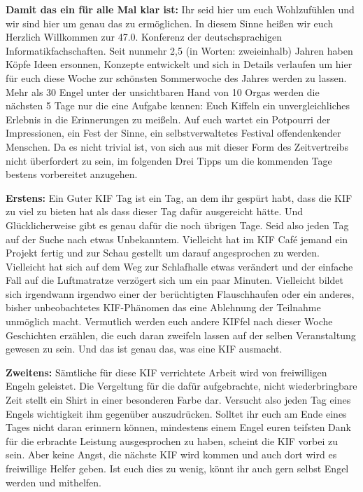
\textbf{Damit das ein für alle Mal klar ist:} Ihr seid hier um euch Wohlzufühlen und wir sind hier um genau das zu ermöglichen.
In diesem Sinne heißen wir euch Herzlich Willkommen zur 47.0. Konferenz der deutschsprachigen Informatikfachschaften.
Seit nunmehr 2,5 (in Worten: zweieinhalb) Jahren haben Köpfe Ideen ersonnen, Konzepte entwickelt und sich in Details verlaufen um hier für euch diese Woche zur schönsten Sommerwoche des Jahres werden zu lassen.
Mehr als 30 Engel unter der unsichtbaren Hand von 10 Orgas werden die nächsten 5 Tage nur die eine Aufgabe kennen: Euch Kiffeln ein unvergleichliches Erlebnis in die Erinnerungen zu meißeln.
Auf euch wartet ein Potpourri der Impressionen, ein Fest der Sinne, ein selbstverwaltetes Festival offendenkender Menschen.
Da es nicht trivial ist, von sich aus mit dieser Form des Zeitvertreibs nicht überfordert zu sein, im folgenden Drei Tipps um die kommenden Tage bestens vorbereitet anzugehen.

\textbf{Erstens:}
Ein Guter KIF Tag ist ein Tag, an dem ihr gespürt habt, dass die KIF zu viel zu bieten hat als dass dieser Tag dafür ausgereicht hätte.
Und Glücklicherweise gibt es genau dafür die noch übrigen Tage.
Seid also jeden Tag auf der Suche nach etwas Unbekanntem.
Vielleicht hat im KIF Café jemand ein Projekt fertig und zur Schau gestellt um darauf angesprochen zu werden.
Vielleicht hat sich auf dem Weg zur Schlafhalle etwas verändert und der einfache Fall auf die Luftmatratze verzögert sich um ein paar Minuten.
Vielleicht bildet sich irgendwann irgendwo einer der berüchtigten Flauschhaufen oder ein anderes, bisher unbeobachtetes KIF-Phänomen das eine Ablehnung der Teilnahme unmöglich macht.
Vermutlich werden euch andere KIFfel nach dieser Woche Geschichten erzählen, die euch daran zweifeln lassen auf der selben Veranstaltung gewesen zu sein.
Und das ist genau das, was eine KIF ausmacht.

\textbf{Zweitens:}
Sämtliche für diese KIF verrichtete Arbeit wird von freiwilligen Engeln geleistet.
Die Vergeltung für die dafür aufgebrachte, nicht wiederbringbare Zeit stellt ein Shirt in einer besonderen Farbe dar.
Versucht also jeden Tag eines Engels wichtigkeit ihm gegenüber auszudrücken.
Solltet ihr euch am Ende eines Tages nicht daran erinnern können, mindestens einem Engel euren teifsten Dank für die erbrachte Leistung ausgesprochen zu haben, scheint die KIF vorbei zu sein.
Aber keine Angst, die nächste KIF wird kommen und auch dort wird es freiwillige Helfer geben.
Ist euch dies zu wenig, könnt ihr auch gern selbst Engel werden und mithelfen.

